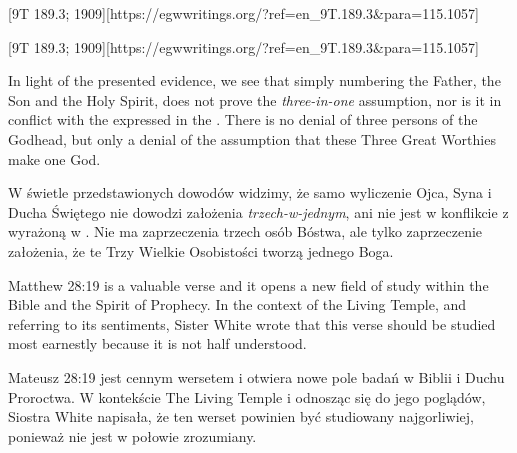 [9T 189.3; 1909][https://egwwritings.org/?ref=en\_9T.189.3&para=115.1057]


[9T 189.3; 1909][https://egwwritings.org/?ref=en\_9T.189.3&para=115.1057]


In light of the presented evidence, we see that simply numbering the Father, the Son and the Holy Spirit, does not prove the \textit{three-in-one} assumption, nor is it in conflict with the  expressed in the . There is no denial of three persons of the Godhead, but only a denial of the assumption that these Three Great Worthies make one God.


W świetle przedstawionych dowodów widzimy, że samo wyliczenie Ojca, Syna i Ducha Świętego nie dowodzi założenia \textit{trzech-w-jednym}, ani nie jest w konflikcie z  wyrażoną w . Nie ma zaprzeczenia trzech osób Bóstwa, ale tylko zaprzeczenie założenia, że te Trzy Wielkie Osobistości tworzą jednego Boga.


Matthew 28:19 is a valuable verse and it opens a new field of study within the Bible and the Spirit of Prophecy. In the context of the Living Temple, and referring to its sentiments, Sister White wrote that this verse should be studied most earnestly because it is not half understood.


Mateusz 28:19 jest cennym wersetem i otwiera nowe pole badań w Biblii i Duchu Proroctwa. W kontekście The Living Temple i odnosząc się do jego poglądów, Siostra White napisała, że ten werset powinien być studiowany najgorliwiej, ponieważ nie jest w połowie zrozumiany.



